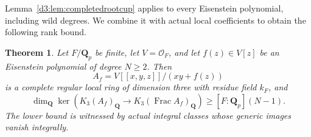 \documentclass[11pt,a4paper]{amsart}
\numberwithin{equation}{section}
\newtheorem{theorem}{Theorem}[section]
\theoremstyle{definition}
\theoremstyle{remark}
\newcommand{\Q}{\mathbf Q}
\newcommand{\OO}{\mathcal O}
\newcommand{\Frac}{\operatorname{Frac}}
\begin{document}
Lemma~\ref{d3:lem:completedrootcup} applies to every Eisenstein polynomial, including wild degrees. We combine it with actual local coefficients to obtain the following rank bound.


\begin{theorem}
\label{d3:thm:completedeisensteinrank}\label{d3:thm:completedtamerank}
Let $F/\Q_p$ be finite, let $V=\OO_F$, and let $f(z)\in V[z]$ be an Eisenstein polynomial of degree $N\geq2$. Then
\[
A_f=V[[x,y,z]]/(xy+f(z))
\]
is a complete regular local ring of dimension three with residue field $k_F$, and
\[
\dim_{\Q}\ker\left(K_3(A_f)_{\Q}
\longrightarrow K_3(\Frac A_f)_{\Q}\right)
\geq [F:\Q_p](N-1).
\]
The lower bound is witnessed by actual integral classes whose generic images vanish integrally.
\end{theorem}
\end{document}
